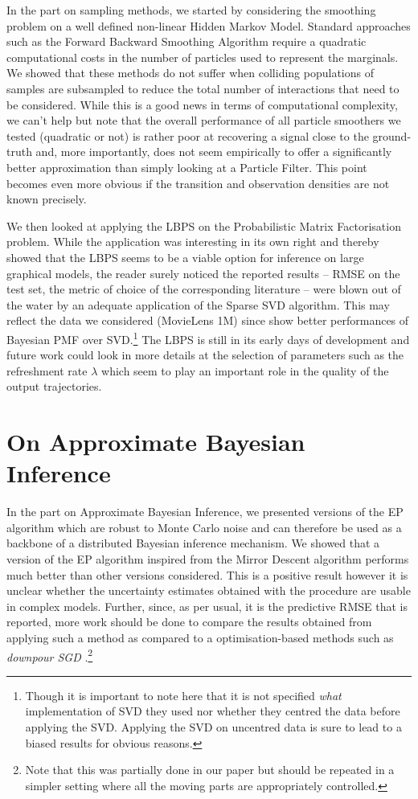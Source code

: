 In the part on sampling methods, we started by considering the smoothing problem on a well defined non-linear Hidden Markov Model. Standard approaches such as the Forward Backward Smoothing Algorithm require a quadratic computational costs in the number of particles used to represent the marginals. We showed that these methods do not suffer when colliding populations of samples are subsampled to reduce the total number of interactions that need to be considered. While this is a good news in terms of computational complexity, we can't help but note that the overall performance of all particle smoothers we tested (quadratic or not) is rather poor at recovering a signal close to the ground-truth and, more importantly, does not seem empirically to offer a significantly better approximation than simply looking at a Particle Filter. This point becomes even more obvious if the transition and observation densities are not known precisely.

We then looked at applying the LBPS on the Probabilistic Matrix Factorisation problem. While the application was interesting in its own right and thereby showed that the LBPS seems to be a viable option for inference on large graphical models, the reader surely noticed the reported results -- RMSE on the test set, the metric of choice of the corresponding literature -- were blown out of the water by an adequate application of the Sparse SVD algorithm. This may reflect the data we considered (MovieLens 1M) since \cite{mnih08} show better performances of Bayesian PMF over SVD.\footnote{Though it is important to note here that it is not specified \emph{what} implementation of SVD they used nor whether they centred the data before applying the SVD. Applying the SVD on uncentred data is sure to lead to a biased results for obvious reasons.} The LBPS is still in its early days of development and future work could look in more details at the selection of parameters such as the refreshment rate $\lambda$ which seem to play an important role in the quality of the output trajectories.

\section{On Approximate Bayesian Inference}

In the part on Approximate Bayesian Inference, we presented versions of the EP algorithm which are robust to Monte Carlo noise and can therefore be used as a backbone of a distributed Bayesian inference mechanism. We showed that a version of the EP algorithm inspired from the Mirror Descent algorithm performs much better than other versions considered. This is a positive result however it is unclear whether the uncertainty estimates obtained with the procedure are usable in complex models. Further, since, as per usual, it is the predictive RMSE that is reported, more work should be done to compare the results obtained from applying such a method as compared to a optimisation-based methods such as \emph{downpour SGD} \citep{dean12}.\footnote{Note that this was partially done in our paper \citep{hasenclever16} but should be repeated in a simpler setting where all the moving parts are appropriately controlled.} 

